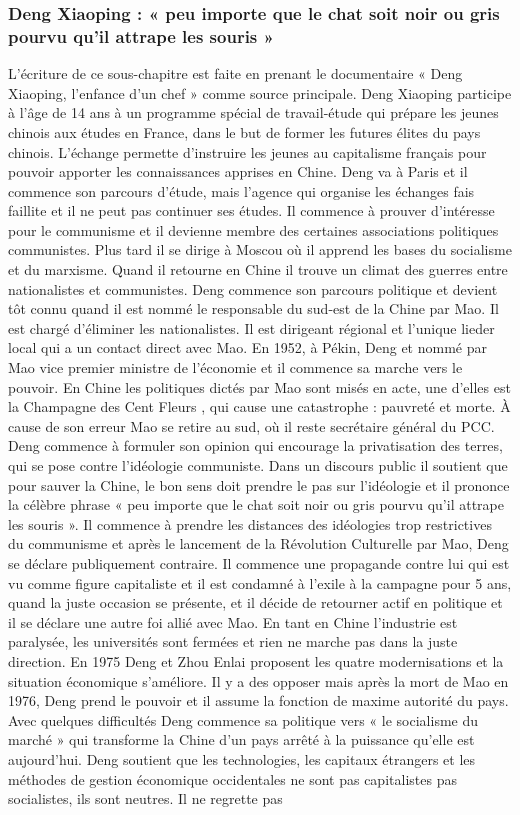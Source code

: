 \subsubsection{Deng Xiaoping : « peu importe que le chat soit noir ou gris pourvu qu’il attrape les souris »}
L’écriture de ce sous-chapitre est faite en prenant le documentaire « Deng Xiaoping, l’enfance d’un chef » comme source principale. 
Deng Xiaoping participe à l’âge de 14 ans à un programme spécial de travail-étude qui prépare les jeunes chinois aux études en France, dans le but de former les futures élites du pays chinois. L’échange permette d’instruire les jeunes au capitalisme  français pour pouvoir apporter les connaissances apprises en Chine. Deng va à Paris et il commence son parcours d’étude, mais l’agence qui organise les échanges fais faillite et il ne peut pas continuer ses études. Il commence à prouver d’intéresse pour le communisme et il devienne membre des certaines associations politiques communistes. Plus tard il se dirige à Moscou où il apprend les bases du socialisme et du marxisme. Quand il retourne en Chine il trouve un climat des guerres entre nationalistes et communistes. Deng commence son parcours politique et devient tôt connu quand il est nommé le responsable du sud-est de la Chine par Mao. Il est chargé d’éliminer les nationalistes. Il est dirigeant régional et l’unique lieder local qui a un contact direct avec Mao. En 1952, à Pékin, Deng et nommé par Mao vice premier ministre de l’économie et il commence sa marche vers le pouvoir. En Chine les politiques dictés par Mao sont misés en acte, une d’elles est la Champagne des Cent Fleurs , qui cause une catastrophe : pauvreté et morte. À cause de son erreur Mao se retire au sud, où il reste secrétaire général du PCC. Deng commence à formuler son opinion qui encourage la privatisation des terres, qui se pose contre l’idéologie communiste. Dans un discours public il soutient que pour sauver la Chine, le bon sens doit prendre le pas sur l’idéologie et il prononce la célèbre phrase « peu importe que le chat soit noir ou gris pourvu qu’il attrape les souris ». Il commence à prendre les distances des idéologies trop restrictives du communisme et après le lancement de la Révolution Culturelle  par Mao, Deng se déclare publiquement contraire. Il commence une propagande contre lui qui est vu comme figure capitaliste et il est condamné à l’exile à la campagne pour 5 ans, quand la juste occasion se présente, et il décide de retourner actif en politique et il se déclare une autre foi allié avec Mao. En tant en Chine l’industrie est paralysée, les universités sont fermées et rien ne marche pas dans la juste direction. En 1975 Deng et Zhou Enlai  proposent les quatre modernisations et la situation économique s’améliore. Il y a des opposer mais après la mort de Mao en 1976, Deng prend le pouvoir et il assume la fonction de maxime autorité du pays. Avec quelques difficultés Deng commence sa politique vers « le socialisme du marché »  qui transforme la Chine d’un pays arrêté à la puissance qu’elle est aujourd’hui. Deng soutient que les technologies, les capitaux étrangers et les méthodes de gestion économique occidentales ne sont pas capitalistes pas socialistes, ils sont neutres. Il ne regrette pas 